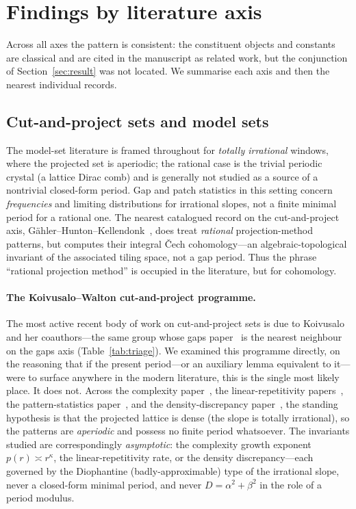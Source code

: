 \documentclass[11pt]{article}
\theoremstyle{plain}
\theoremstyle{remark}
\begin{document}
\section{Findings by literature axis}\label{sec:findings}

Across all axes the pattern is consistent: the constituent objects and constants are
classical and are cited in the manuscript as related work, but the conjunction of
Section~\ref{sec:result} was not located. We summarise each axis and then the
nearest individual records.

\subsection{Cut-and-project sets and model sets}

The model-set literature \cite{Meyer1972,BaakeGrimm2013,Senechal1995} is framed
throughout for \emph{totally irrational} windows, where the projected set is
aperiodic; the rational case is the trivial periodic crystal (a lattice Dirac comb)
and is generally not studied as a source of a nontrivial closed-form period. Gap and
patch statistics in this setting concern \emph{frequencies} and limiting
distributions for irrational slopes, not a finite minimal period for a rational one.
The nearest catalogued record on the cut-and-project axis,
G\"ahler--Hunton--Kellendonk~\cite{GaehlerHuntonKellendonk2013}, does treat
\emph{rational} projection-method patterns, but computes their integral \v{C}ech
cohomology---an algebraic-topological invariant of the associated tiling space, not a
gap period. Thus the phrase ``rational projection method'' is occupied in the
literature, but for cohomology.

\paragraph{The Koivusalo--Walton cut-and-project programme.}
The most active recent body of work on cut-and-project sets is due to Koivusalo and
her coauthors---the same group whose gaps paper~\cite{HaynesEtAl2016} is the nearest
neighbour on the gaps axis (Table~\ref{tab:triage}). We examined this programme
directly, on the reasoning that if the present period---or an auxiliary lemma
equivalent to it---were to surface anywhere in the modern literature, this is the
single most likely place. It does not. Across the complexity
paper~\cite{KoivusaloWalton2021}, the linear-repetitivity
papers~\cite{HaynesKoivusaloWalton2015,KoivusaloWalton2020}, the pattern-statistics
paper~\cite{HaynesJulienKoivusaloWalton2017}, and the density-discrepancy
paper~\cite{KoivusaloLagace2024}, the standing hypothesis is that the projected
lattice is dense (the slope is totally irrational), so the patterns are
\emph{aperiodic} and possess no finite period whatsoever. The invariants studied are
correspondingly \emph{asymptotic}: the complexity growth exponent $p(r)\asymp
r^{\kappa}$, the linear-repetitivity rate, or the density discrepancy---each governed
by the Diophantine (badly-approximable) type of the irrational slope, never a
closed-form minimal period, and never $D=\alpha^2+\beta^2$ in the role of a period
modulus.
\end{document}
